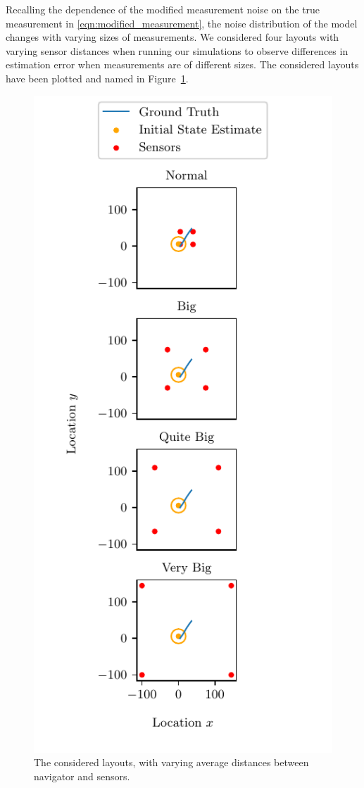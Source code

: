 \documentclass[10pt,letterpaper,oneside,twocolumn,journal]{IEEEtran}
\theoremstyle{definition}
\theoremstyle{definition}
\theoremstyle{remark}
\begin{document}
Recalling the dependence of the modified measurement noise on the true measurement in \eqref{eqn:modified_measurement}, the noise distribution of the model changes with varying sizes of measurements. We considered four layouts with varying sensor distances when running our simulations to observe differences in estimation error when measurements are of different sizes. The considered layouts have been plotted and named in Figure~\ref{fig:sim_layouts}.
\begin{figure}[htbp]
\centering
\includegraphics{images/layouts.pdf}
\caption{The considered layouts, with varying average distances between navigator and sensors.}
\label{fig:sim_layouts}
\end{figure}
\end{document}
